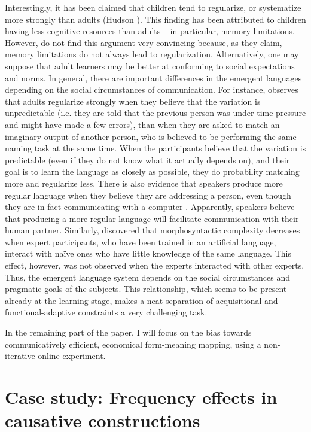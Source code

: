 \documentclass[output=paper]{langsci/langscibook}
\begin{document}
Interestingly, it has been claimed that children tend to regularize, or systematize more strongly than adults (Hudson \citealt{KamNewport2009}). This finding has been attributed to children having less cognitive resources than adults – in particular, memory limitations. However, \citet{SmithEtAl2017} do not find this argument very convincing because, as they claim, memory limitations do not always lead to regularization. Alternatively, one may suppose that adult learners may be better at conforming to social expectations and norms. In general, there are important differences in the emergent languages depending on the social circumstances of communication. For instance, \citet{Perfors2016} observes that adults regularize strongly when they believe that the variation is unpredictable (i.e. they are told that the previous person was under time pressure and might have made a few errors), than when they are asked to match an imaginary output of another person, who is believed to be performing the same naming task at the same time. When the participants believe that the variation is predictable (even if they do not know what it actually depends on), and their goal is to learn the language as closely as possible, they do probability matching more and regularize less. There is also evidence that speakers produce more regular language when they believe they are addressing a person, even though they are in fact communicating with a computer \citep{FehérEtAl2016}. Apparently, speakers believe that producing a more regular language will facilitate communication with their human partner. Similarly, \citet{Little2011} discovered that morphosyntactic complexity decreases when expert participants, who have been trained in an artificial language, interact with naïve ones who have little knowledge of the same language. This effect, however, was not observed when the experts interacted with other experts. Thus, the emergent language system depends on the social circumstances and pragmatic goals of the subjects. This relationship, which seems to be present already at the learning stage, makes a neat separation of acquisitional and functional-adaptive constraints a very challenging task.  

In the remaining part of the paper, I will focus on the bias towards communicatively efficient, economical form-meaning mapping, using a non-iterative online experiment.

\section{Case study: Frequency effects in causative constructions}
\end{document}
